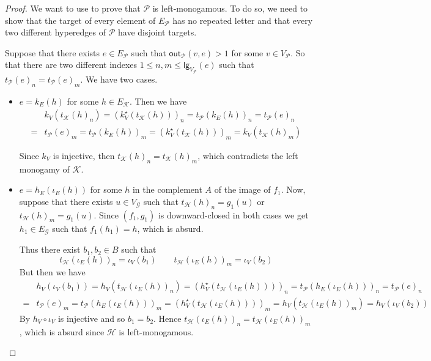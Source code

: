 \documentclass[3p]{elsarticle}
\newcommand{\lgh}{\mathsf{lg}}
\newcommand{\outd}[1]{\mathsf{out}_{\mathcal{#1}}}
\theoremstyle{remark}
\theoremstyle{definition}
\begin{document}
\begin{proof}
We want to use  to prove that $\mathcal{P}$ is left-monogamous. To do so, we need to show that the target of every element of $E_{\mathcal{P}}$ has no repeated letter and that every two different hyperedges of $\mathcal{P}$ have disjoint targets.

Suppose that there exists $e \in E_{\mathcal{P}}$ such that $\outd{P}(v,e) > 1$ for some $v\in V_{\mathcal{P}}$. So that there are two different  indexes $1\leq n, m \leq \lgh_{V_{\mathcal{P}}}(e)$ such that $t_{\mathcal{P}}(e)_n=t_{\mathcal{P}}(e)_m$. We have two cases.
\begin{itemize}
	\item $e= k_E(h)$ for some $h\in E_{\mathcal{K}}$.  %
	Then we have
	\begin{align*}
		&k_V(t_{\mathcal{K}}(h)_n)=(k^\star_V(t_{\mathcal{K}}(h)))_n=t_{\mathcal{P}}(k_E(h))_n=t_{\mathcal{P}}(e)_n \\=& t_{\mathcal{P}}(e)_m = t_{\mathcal{P}}(k_E(h))_m=(k^\star_V(t_{\mathcal{K}}(h)))_m = k_V(t_{\mathcal{K}}(h)_m)	\end{align*}
	
	Since $k_V$ is injective, then $t_{\mathcal{K}}(h)_n=t_{\mathcal{K}}(h)_m$, which contradicts the left monogamy of $\mathcal{K}$.
	
	\item $e=h_E(\iota_E(h))$ for some $h$ in the complement $A$ of the image of $f_1$.  Now, suppose that there exists $u \in V_{\mathcal{G}}$ such that $t_{\mathcal{H}}(h)_n = g_1(u) $ or $t_{\mathcal{H}}(h)_m = g_1(u)$. Since $(f_1, g_1)$ is downward-closed in both cases we get $h_1\in E_{\mathcal{G}}$ such that $f_1(h_1)=h$, which is absurd. 
	
	Thus there exist $b_1, b_2\in B$ such that
	\[t_{\mathcal{H}}(\iota_E(h))_n = \iota_V(b_1) \qquad  t_{\mathcal{H}}(\iota_E(h))_m = \iota_V(b_2)\] 
	But then we have
	\begin{align*}
		&h_V(\iota_V(b_1))=h_V(t_{\mathcal{H}}(\iota_E(h))_n)=(h^\star_V(t_{\mathcal{H}}(\iota_E(h))))_n=t_{\mathcal{P}}(h_E(\iota_E(h)))_n=t_{\mathcal{P}}(e)_n\\=&t_{\mathcal{P}}(e)_m=t_{\mathcal{P}}(h_E(\iota_E(h)))_m=(h^\star_V(t_{\mathcal{H}}(\iota_E(h))))_m=h_V(t_{\mathcal{H}}(\iota_E(h))_m)=	h_V(\iota_V(b_2))
	\end{align*}
	By  $h_V\circ \iota_V$ is injective and so $b_1 = b_2$. Hence $t_{\mathcal{H}}(\iota_E(h))_n =t_{\mathcal{H}}(\iota_E(h))_m $, which is absurd since $\mathcal{H}$ is left-monogamous.
\end{itemize}
 

\end{proof}
\end{document}

